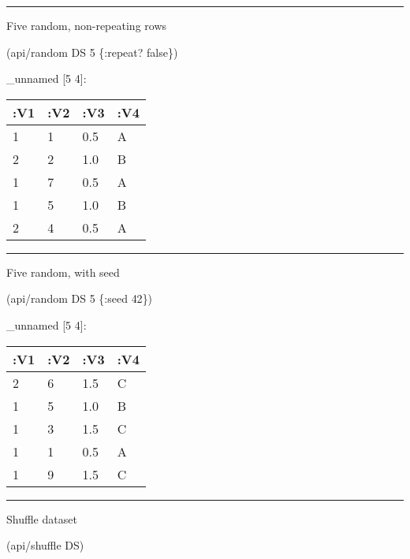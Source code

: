 \documentclass[]{article}
\newenvironment{Shaded}{\begin{snugshade}}{\end{snugshade}}
\newcommand{\AttributeTok}[1]{\textcolor[rgb]{0.77,0.63,0.00}{#1}}
\newcommand{\DecValTok}[1]{\textcolor[rgb]{0.00,0.00,0.81}{#1}}
\newcommand{\NormalTok}[1]{#1}
\newcommand{\VariableTok}[1]{\textcolor[rgb]{0.00,0.00,0.00}{#1}}
\begin{document}
\begin{center}\rule{0.5\linewidth}{0.5pt}\end{center}

Five random, non-repeating rows

\begin{Shaded}
\begin{Highlighting}[]
\NormalTok{(api/random DS }\DecValTok{5}\NormalTok{ \{}\AttributeTok{:repeat}\NormalTok{? }\VariableTok{false}\NormalTok{\})}
\end{Highlighting}
\end{Shaded}

\_unnamed {[}5 4{]}:

\begin{longtable}[]{@{}llll@{}}
\toprule
:V1 & :V2 & :V3 & :V4\tabularnewline
\midrule
\endhead
1 & 1 & 0.5 & A\tabularnewline
2 & 2 & 1.0 & B\tabularnewline
1 & 7 & 0.5 & A\tabularnewline
1 & 5 & 1.0 & B\tabularnewline
2 & 4 & 0.5 & A\tabularnewline
\bottomrule
\end{longtable}

\begin{center}\rule{0.5\linewidth}{0.5pt}\end{center}

Five random, with seed

\begin{Shaded}
\begin{Highlighting}[]
\NormalTok{(api/random DS }\DecValTok{5}\NormalTok{ \{}\AttributeTok{:seed} \DecValTok{42}\NormalTok{\})}
\end{Highlighting}
\end{Shaded}

\_unnamed {[}5 4{]}:

\begin{longtable}[]{@{}llll@{}}
\toprule
:V1 & :V2 & :V3 & :V4\tabularnewline
\midrule
\endhead
2 & 6 & 1.5 & C\tabularnewline
1 & 5 & 1.0 & B\tabularnewline
1 & 3 & 1.5 & C\tabularnewline
1 & 1 & 0.5 & A\tabularnewline
1 & 9 & 1.5 & C\tabularnewline
\bottomrule
\end{longtable}

\begin{center}\rule{0.5\linewidth}{0.5pt}\end{center}

Shuffle dataset

\begin{Shaded}
\begin{Highlighting}[]
\NormalTok{(api/shuffle DS)}
\end{Highlighting}
\end{Shaded}
\end{document}
